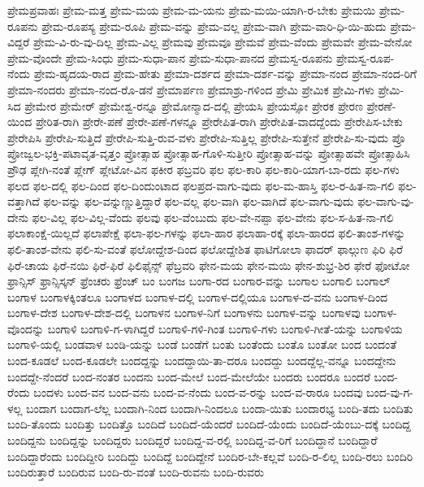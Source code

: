 ಪ್ರೇಮಪ್ರವಾಹಃ
ಪ್ರೇಮ-ಮತ್ತ
ಪ್ರೇಮ-ಮಯ
ಪ್ರೇಮ-ಮ-ಯನು
ಪ್ರೇಮ-ಮಯಿ-ಯಾಗಿ-ರ-ಬೇಕು
ಪ್ರೇಮಯಿ
ಪ್ರೇಮ-ರೂಪನು
ಪ್ರೇಮ-ರೂಪಸ್ಯ
ಪ್ರೇಮ-ರೂಪಿ
ಪ್ರೇಮ-ವನ್ನು
ಪ್ರೇಮ-ವಲ್ಲ
ಪ್ರೇಮ-ವಾಗಿ
ಪ್ರೇಮ-ವಾರಿ-ಧಿ-ಯಿ-ಹುದು
ಪ್ರೇಮ-ವಿದ್ದರೆ
ಪ್ರೇಮ-ವಿ-ರು-ವು-ದಿಲ್ಲ
ಪ್ರೇಮ-ವಿಲ್ಲ
ಪ್ರೇಮವು
ಪ್ರೇಮವೂ
ಪ್ರೇಮವೆ
ಪ್ರೇಮ-ವೆಂದು
ಪ್ರೇಮವೇ
ಪ್ರೇಮ-ವೇನೋ
ಪ್ರೇಮ-ವೊಂದೇ
ಪ್ರೇಮ-ಸಿಂಧು
ಪ್ರೇಮ-ಸುಧಾ-ಪಾನ
ಪ್ರೇಮ-ಸುಧಾ-ಪಾನದ
ಪ್ರೇಮಸ್ವ-ರೂಪನು
ಪ್ರೇಮಸ್ವ-ರೂಪ-ನೆಂದು
ಪ್ರೇಮ-ಹೃದಯ-ರಾದ
ಪ್ರೇಮ-ಹೇತು
ಪ್ರೇಮಾ-ದರ್ಶದ
ಪ್ರೇಮಾ-ದರ್ಶ-ವನ್ನು
ಪ್ರೇಮಾ-ನಂದ
ಪ್ರೇಮಾ-ನಂದ-ರಿಗೆ
ಪ್ರೇಮಾ-ನಂದರು
ಪ್ರೇಮಾ-ನಂದ-ರೊ-ಡನೆ
ಪ್ರೇಮಾರ್ಪಣ
ಪ್ರೇಮಾಶ್ರು-ಗಳಿಂದ
ಪ್ರೇಮಿ
ಪ್ರೇಮಿಕ
ಪ್ರೇಮಿ-ಗಳು
ಪ್ರೇಮಿ-ಸಿದ
ಪ್ರೇಮೇರ
ಪ್ರೇಮೇರ್‌
ಪ್ರೇಮೇಶ್ವ-ರನ್ನೂ
ಪ್ರೇಮೋನ್ಮಾದ-ದಲ್ಲಿ
ಪ್ರೇಯಸಿ
ಪ್ರೇಯಸ್ಸೋ
ಪ್ರೇರಕ
ಪ್ರೇರಣ
ಪ್ರೇರಣೆ-ಯಿಂದ
ಪ್ರೇರಿತ-ರಾಗಿ
ಪ್ರೇರೇ-ಪಣೆ
ಪ್ರೇರೇ-ಪಣೆ-ಗಳನ್ನೂ
ಪ್ರೇರೇಪಿತ-ರಾಗಿ
ಪ್ರೇರೇಪಿತ-ವಾದದ್ದೆಂದು
ಪ್ರೇರೇಪಿಸ-ಬೇಕು
ಪ್ರೇರೇಪಿಸಿ
ಪ್ರೇರೇಪಿ-ಸುತ್ತಿದೆ
ಪ್ರೇರೇಪಿ-ಸುತ್ತಿ-ರುವ-ವಳು
ಪ್ರೇರೇಪಿ-ಸುತ್ತಿಲ್ಲ
ಪ್ರೇರೇಪಿ-ಸುತ್ತೇನೆ
ಪ್ರೇರೇಪಿ-ಸು-ವುದು
ಪ್ರೊ
ಪ್ರೋಜ್ವಲ-ಭಕ್ತಿ-ಪಟಾವೃತ-ವೃತ್ತಂ
ಪ್ರೋತ್ಸಾಹ
ಪ್ರೋತ್ಸಾಹ-ಗೊಳಿ-ಸುತ್ತೀರಿ
ಪ್ರೋತ್ಸಾಹ-ವನ್ನು
ಪ್ರೋತ್ಸಾಹವೇ
ಪ್ರೋತ್ಸಾಹಿಸಿ
ಪ್ರೌಢ
ಪ್ಲೇಗಿ-ನಂತೆ
ಪ್ಲೇಗ್
ಪ್ಲೇಟೋ-ವಿನ
ಫಕೀರ
ಫಬ್ರವರಿ
ಫಲ
ಫಲ-ಕಾರಿ
ಫಲ-ಕಾರಿ-ಯಾಗ-ಬಾ-ರದು
ಫಲ-ಗಳು
ಫಲದ
ಫಲ-ದಲ್ಲಿ
ಫಲ-ದಿಂದ
ಫಲ-ದಿಂದುಂಟಾದ
ಫಲಪ್ರದ-ವಾಗು-ವುದು
ಫಲ-ಮ-ಹಾಸ್ತಿ
ಫಲ-ರ-ಹಿತ-ನಾ-ಗಲಿ
ಫಲ-ವತ್ತಾಗಿದೆ
ಫಲ-ವನ್ನು
ಫಲ-ವನ್ನುಣ್ಣುತ್ತಿದ್ದಾರೆ
ಫಲ-ವಲ್ಲ
ಫಲ-ವಾಗಿ
ಫಲ-ವಾಗಿದೆ
ಫಲ-ವಾಗು-ವುದು
ಫಲ-ವಾಗು-ವು-ದೇನು
ಫಲ-ವಿಲ್ಲ
ಫಲ-ವಿಲ್ಲ-ವೆಂದು
ಫಲವು
ಫಲ-ವೆಂಬುದು
ಫಲ-ವೇ-ನಪ್ಪಾ
ಫಲ-ವೇನು
ಫಲ-ಸ-ಹಿತ-ನಾ-ಗಲಿ
ಫಲಾಕಾಂಕ್ಷೆ-ಯಿಲ್ಲದೆ
ಫಲಾಪೇಕ್ಷೆ
ಫಲಾ-ಫಲ-ಗಳನ್ನು
ಫಲಾ-ಹಾರ
ಫಲಾಹಾ-ರಕ್ಕೆ
ಫಲಾ-ಹಾರದ
ಫಲಿ-ತಾಂಶ-ಗಳನ್ನು
ಫಲಿ-ತಾಂಶ-ವೇನು
ಫಲಿ-ಸು-ವಂತೆ
ಫಲೋದ್ದೇಶ-ದಿಂದ
ಫಲೋದ್ದೇಶಿತ
ಫಾಟಿಗೋಲಾ
ಫಾದರ್
ಫಾಲ್ಗುಣ
ಫಿರಿ
ಫಿರೆ
ಫಿರೆ-ಚಾಯ
ಫಿರೆ-ನಯಿ
ಫಿರೆ-ಫಿರೆ
ಫಿಲಿಫೈನ್ಸ್
ಫೆಬ್ರವರಿ
ಫೇನ-ಮಯ
ಫೇನ-ಮಯಿ
ಫೇನ-ಶುಭ್ರ-ಶಿರ
ಫೇರೆ
ಫೋಟೋ
ಫ್ರಾನ್ಸಿಸ್
ಫ್ರಾನ್ಸಿಸ್ಕನ್
ಫ್ರೆಂಚರು
ಫ್ರೆಂಚ್
ಬಂ
ಬಂಗಜ
ಬಂಗಾ-ರದ
ಬಂಗಾರ-ವನ್ನು
ಬಂಗಾಲ
ಬಂಗಾಲಿ
ಬಂಗಾಲ್
ಬಂಗಾಳ
ಬಂಗಾಳಕ್ಕಿಂತಲೂ
ಬಂಗಾಳದ
ಬಂಗಾಳ-ದಲ್ಲಿ
ಬಂಗಾಳ-ದಲ್ಲಿಯೂ
ಬಂಗಾಳ-ದ-ವನು
ಬಂಗಾಳ-ದಿಂದ
ಬಂಗಾಳ-ದೇಶ
ಬಂಗಾಳ-ದೇಶ-ದಲ್ಲಿ
ಬಂಗಾಳನ
ಬಂಗಾಳ-ನಿಗೆ
ಬಂಗಾಳನು
ಬಂಗಾಳ-ವನ್ನು
ಬಂಗಾಳವು
ಬಂಗಾಳ-ವೊಂದನ್ನು
ಬಂಗಾಳಿ
ಬಂಗಾಳಿ-ಗ-ಳಾಗಿದ್ದರೆ
ಬಂಗಾಳಿ-ಗಳಿ-ಗಿಂತ
ಬಂಗಾಳಿ-ಗಳು
ಬಂಗಾಳಿ-ಗೀತೆ-ಯನ್ನು
ಬಂಗಾಳಿಯ
ಬಂಗಾಳಿ-ಯಲ್ಲಿ
ಬಂಡವಾಳ
ಬಂಡಿ-ಯನ್ನು
ಬಂಡೆ
ಬಂಡೆಗೆ
ಬಂತು
ಬಂತೆಂದು
ಬಂತೊ
ಬಂತೋ
ಬಂದ
ಬಂದಂತೆ
ಬಂದ-ಕೂಡಲೆ
ಬಂದ-ಕೂಡಲೇ
ಬಂದದ್ದನ್ನು
ಬಂದದ್ದಾಯಿ-ತಾ-ದರೂ
ಬಂದದ್ದು
ಬಂದದ್ದೆಲ್ಲ-ವನ್ನೂ
ಬಂದದ್ದೇನು
ಬಂದದ್ದೇ-ನೆಂದರೆ
ಬಂದ-ನಂತರ
ಬಂದನು
ಬಂದ-ಮೇಲೆ
ಬಂದ-ಮೇಲೆಯೇ
ಬಂದರು
ಬಂದರೂ
ಬಂದರೆ
ಬಂದ-ರೆಂದು
ಬಂದಳು
ಬಂದ-ವನ
ಬಂದ-ವನು
ಬಂದ-ವ-ನೆಂದು
ಬಂದ-ವ-ರನ್ನು
ಬಂದ-ವ-ರಾರೂ
ಬಂದವು
ಬಂದ-ವು-ಗ-ಳಲ್ಲ
ಬಂದಾಗ
ಬಂದಾಗ-ಲೆಲ್ಲ
ಬಂದಾಗಿ-ನಿಂದ
ಬಂದಾಗಿ-ನಿಂದಲೂ
ಬಂದಾ-ಯಿತು
ಬಂದಾರಭ್ಯ
ಬಂದಿ-ತದು
ಬಂದಿತು
ಬಂದಿ-ತೊಂದು
ಬಂದಿತ್ತು
ಬಂದಿತ್ತೊ
ಬಂದಿದೆ
ಬಂದಿದೆ-ಯೆಂದರೆ
ಬಂದಿದೆ-ಯೆಂದು
ಬಂದಿದೆ-ಯೆಂಬು-ದಕ್ಕೆ
ಬಂದಿದ್ದ
ಬಂದಿದ್ದನು
ಬಂದಿದ್ದನ್ನು
ಬಂದಿದ್ದರು
ಬಂದಿದ್ದರೆ
ಬಂದಿದ್ದ-ವ-ರಲ್ಲಿ
ಬಂದಿದ್ದ-ವ-ರಿಗೆ
ಬಂದಿದ್ದಾನೆ
ಬಂದಿದ್ದಾರೆ
ಬಂದಿದ್ದಾರೆಂದು
ಬಂದಿದ್ದೀರಿ
ಬಂದಿದ್ದು
ಬಂದಿದ್ದೆ
ಬಂದಿದ್ದೇನೆ
ಬಂದಿರ-ಬೇ-ಕಲ್ಲವೆ
ಬಂದಿ-ರ-ಲಿಲ್ಲ
ಬಂದಿ-ರಲು
ಬಂದಿರಿ
ಬಂದಿರುತ್ತಾರೆ
ಬಂದಿರುವ
ಬಂದಿ-ರು-ವಂತೆ
ಬಂದಿ-ರುವನು
ಬಂದಿ-ರುವರು
